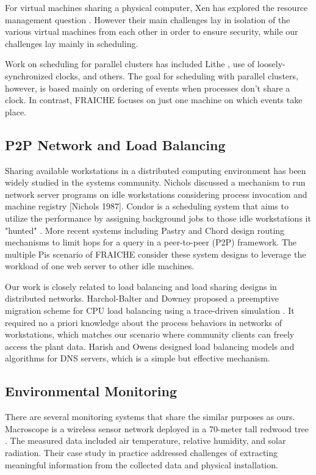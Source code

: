 \documentclass[a4paper]{acm_proc_article-sp}
\begin{document}
For virtual machines sharing a physical computer, Xen has explored the resource management question \cite{Barham:2003cj}.  However their main challenges lay in isolation of the various virtual machines from each other in order to ensure security, while our challenges lay mainly in scheduling.

Work on scheduling for parallel clusters has included Lithe \cite{Pan:2010wo}, use of loosely-synchronized clocks, and others.  The goal for scheduling with parallel clusters, however, is based mainly on ordering of events when processes don't share a clock.  In contrast, FRAICHE focuses on just one machine on which events take place.

\subsection{P2P Network and Load Balancing}

Sharing available workstations in a distributed computing environment has been widely studied in the systems community. Nichols discussed a mechanism to run network server programs on idle workstations considering process invocation and machine registry \cite{}[Nichols 1987]. Condor is a scheduling system that aims to utilize the performance by assigning background jobs to those idle workstations it "hunted" \cite{Litzkow:1988wd}. More recent systems including Pastry \cite{Rowstron:2001ea} and Chord \cite{Stoica:2001dj} design routing mechanisms to limit hops for a query in a peer-to-peer (P2P) framework. The multiple Pis scenario of FRAICHE consider these system designs to leverage the workload of one web server to other idle machines.

Our work is closely related to load balancing and load sharing designs in distributed networks. Harchol-Balter and Downey proposed a preemptive migration scheme for CPU load balancing using a trace-driven simulation \cite{HarcholBalter:1997wo}. It required no a priori knowledge about the process behaviors in networks of workstations, which matches our scenario where community clients can freely access the plant data. Harish and Owens \cite{Harish:1999wt} designed load balancing models and algorithms for DNS servers, which is a simple but effective mechanism.

\subsection{Environmental Monitoring}

There are several monitoring systems that share the similar purposes as ours. Macroscope is a wireless sensor network deployed in a 70-meter tall redwood tree \cite{Tolle:2005wk}. The measured data included air temperature, relative humidity, and solar radiation. Their case study in practice addressed challenges of extracting meaningful information from the collected data and physical installation. 
\end{document}
